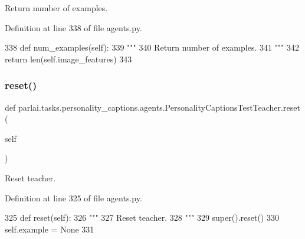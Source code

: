 \begin{DoxyVerb}Return number of examples.
\end{DoxyVerb}
 

Definition at line 338 of file agents.\+py.


\begin{DoxyCode}
338     \textcolor{keyword}{def }num\_examples(self):
339         \textcolor{stringliteral}{"""}
340 \textcolor{stringliteral}{        Return number of examples.}
341 \textcolor{stringliteral}{        """}
342         \textcolor{keywordflow}{return} len(self.image\_features)
343 
\end{DoxyCode}
\mbox{\label{classparlai_1_1tasks_1_1personality__captions_1_1agents_1_1PersonalityCaptionsTestTeacher_acb0270ac7c4e00d2e9067082599d4c16}} 
\subsubsection{\texorpdfstring{reset()}{reset()}}
{\footnotesize\ttfamily def parlai.\+tasks.\+personality\+\_\+captions.\+agents.\+Personality\+Captions\+Test\+Teacher.\+reset (\begin{DoxyParamCaption}\item[{}]{self }\end{DoxyParamCaption})}

\begin{DoxyVerb}Reset teacher.
\end{DoxyVerb}
 

Definition at line 325 of file agents.\+py.


\begin{DoxyCode}
325     \textcolor{keyword}{def }reset(self):
326         \textcolor{stringliteral}{"""}
327 \textcolor{stringliteral}{        Reset teacher.}
328 \textcolor{stringliteral}{        """}
329         super().reset()
330         self.example = \textcolor{keywordtype}{None}
331 
\end{DoxyCode}


